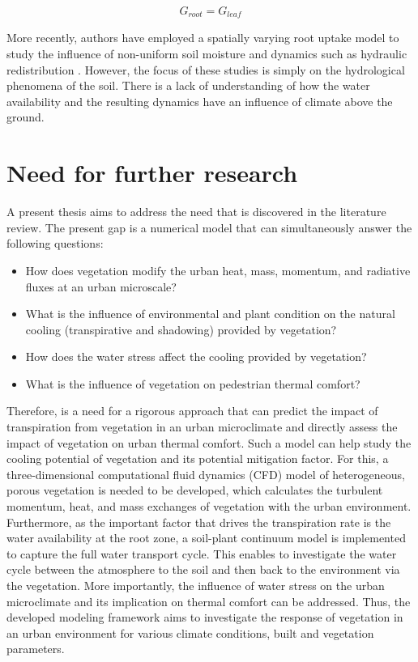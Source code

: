 	 \begin{equation}
	 G_{\textit{root}} = G_{\textit{leaf}}
	 \end{equation}
	 
More recently, authors have employed a spatially varying root uptake model to study the influence of non-uniform soil moisture and dynamics such as hydraulic redistribution \citep{Volpe2013,Manoli2014a,Huang2017, Lai2000, Manoli2014}. However, the focus of these studies is simply on the hydrological phenomena of the soil. There is a lack of understanding of how the water availability and the resulting dynamics have an influence of climate above the ground. 
	
\section{Need for further research}

A present thesis aims to address the need that is discovered in the literature review. The present gap is a numerical model that can simultaneously answer the following questions:
\begin{itemize}
	\item How does vegetation modify the urban heat, mass, momentum, and radiative fluxes at an urban microscale?
	\item What is the influence of environmental and plant condition on the natural cooling (transpirative and shadowing) provided by vegetation?
	\item How does the water stress affect the cooling provided by vegetation?
	\item What is the influence of vegetation on pedestrian thermal comfort?
\end{itemize}

Therefore, is a need for a rigorous approach that can predict the impact of transpiration from vegetation in an urban microclimate and directly assess the impact of vegetation on urban thermal comfort. Such a model can help study the cooling potential of vegetation and its potential mitigation factor. For this, a three-dimensional computational fluid dynamics (CFD) model of heterogeneous, porous vegetation is needed to be developed, which calculates the turbulent momentum, heat, and mass exchanges of vegetation with the urban environment. Furthermore, as the important factor that drives the transpiration rate is the water availability at the root zone, a soil-plant continuum model is implemented to capture the full water transport cycle. This enables to investigate the water cycle between the atmosphere to the soil and then back to the environment via the vegetation. More importantly, the influence of water stress on the urban microclimate and its implication on thermal comfort can be addressed. Thus, the developed modeling framework aims to investigate the response of vegetation in an urban environment for various climate conditions, built and vegetation parameters.
